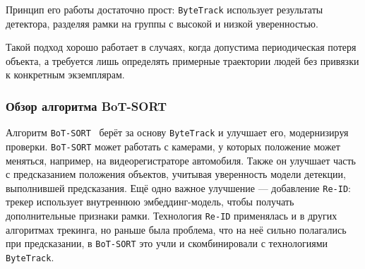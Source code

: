 Принцип его работы достаточно прост: \texttt{ByteTrack} использует результаты детектора, разделяя рамки на группы с высокой и низкой уверенностью.

Такой подход хорошо работает в случаях, когда допустима периодическая потеря объекта, а требуется лишь определять примерные траектории людей без привязки к конкретным экземплярам.

%
%
\subsubsection{Обзор алгоритма BoT-SORT}

Алгоритм \texttt{BoT-SORT}~\cite{aharon2022botsort} берёт за основу \texttt{ByteTrack} и улучшает его, модернизируя проверки.
\texttt{BoT-SORT} может работать с камерами, у которых положение может меняться,
например, на видеорегистраторе автомобиля. Также он улучшает часть с предсказанием положения объектов,
учитывая уверенность модели детекции, выполнившей предсказания.
Ещё одно важное улучшение --- добавление \texttt{Re-ID}: трекер использует внутреннюю эмбеддинг-модель,
чтобы получать дополнительные признаки рамки. Технология \texttt{Re-ID} применялась и в других алгоритмах трекинга,
но раньше была проблема, что на неё сильно полагались при предсказании,
в \texttt{BoT-SORT} это учли и скомбинировали с технологиями \texttt{ByteTrack}.






